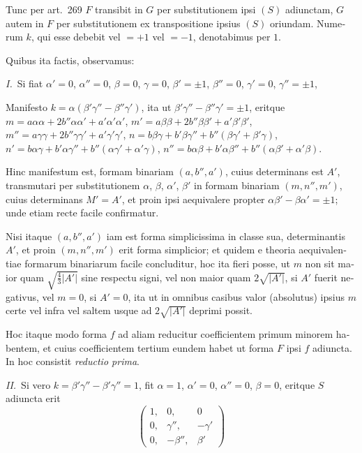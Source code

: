 \documentclass[12pt,a4paper]{article}
\theoremstyle{plain}
\theoremstyle{definition}
\theoremstyle{remark}
\begin{document}
\begin{otherlanguage}{latin}
Tunc per art.\ 269 $F$ transibit in $G$ per substitutionem ipsi $(S)$ adiunctam, $G$ autem in $F$ per substitutionem ex transpositione ipsius $(S)$ oriundam. Numerum $k$, qui esse debebit vel $= +1$ vel $= -1$, denotabimus per $1$.

Quibus ita factis, observamus:

\textit{I.}\ Si fiat $\alpha' = 0$, $\alpha'' = 0$, $\beta = 0$, $\gamma = 0$, $\beta' = \pm 1$, $\beta'' = 0$, $\gamma' = 0$, $\gamma'' = \pm 1$,

Manifesto $k = \alpha(\beta'\gamma'' - \beta''\gamma')$, ita ut $\beta'\gamma'' - \beta''\gamma' = \pm 1$, eritque $m = a\alpha\alpha + 2b''\alpha\alpha' + a'\alpha'\alpha'$, $m' = a\beta\beta + 2b''\beta\beta' + a'\beta'\beta'$, $m'' = a\gamma\gamma + 2b''\gamma\gamma' + a'\gamma'\gamma'$, $n = b\beta\gamma + b'\beta\gamma'' + b''(\beta\gamma' + \beta'\gamma)$, $n' = b\alpha\gamma + b'\alpha\gamma'' + b''(\alpha\gamma' + \alpha'\gamma)$, $n'' = b\alpha\beta + b'\alpha\beta'' + b''(\alpha\beta' + \alpha'\beta)$.

Hinc manifestum est, formam binariam $(a, b'', a')$, cuius determinans est $A'$, transmutari per substitutionem $\alpha$, $\beta$, $\alpha'$, $\beta'$ in formam binariam $(m, n'', m')$, cuius determinans $M' = A'$, et proin ipsi aequivalere propter $\alpha\beta' - \beta\alpha' = \pm 1$; unde etiam recte facile confirmatur.

Nisi itaque $(a, b'', a')$ iam est forma simplicissima in classe sua, determinantis $A'$, et proin $(m, n'', m')$ erit forma simplicior; et quidem e theoria aequivalentiae formarum binariarum facile concluditur, hoc ita fieri posse, ut $m$ non sit maior quam $\sqrt{\frac{4}{3}|A'|}$ sine respectu signi, vel non maior quam $2\sqrt{|A'|}$, si $A'$ fuerit negativus, vel $m = 0$, si $A' = 0$, ita ut in omnibus casibus valor (absolutus) ipsius $m$ certe vel infra vel saltem usque ad $2\sqrt{|A'|}$ deprimi possit.

Hoc itaque modo forma $f$ ad aliam reducitur coefficientem primum minorem habentem, et cuius coefficientem tertium eundem habet ut forma $F$ ipsi $f$ adiuncta. In hoc consistit \emph{reductio prima}.

\textit{II.}\ Si vero $k = \beta'\gamma'' - \beta'\gamma'' = 1$, fit $\alpha = 1$, $\alpha' = 0$, $\alpha'' = 0$, $\beta = 0$, eritque $S$ adiuncta erit
\[
\begin{pmatrix} 1, & 0, & 0 \\ 0, & \gamma'', & -\gamma' \\ 0, & -\beta'', & \beta' \end{pmatrix}
\]


\end{otherlanguage}
\end{document}

